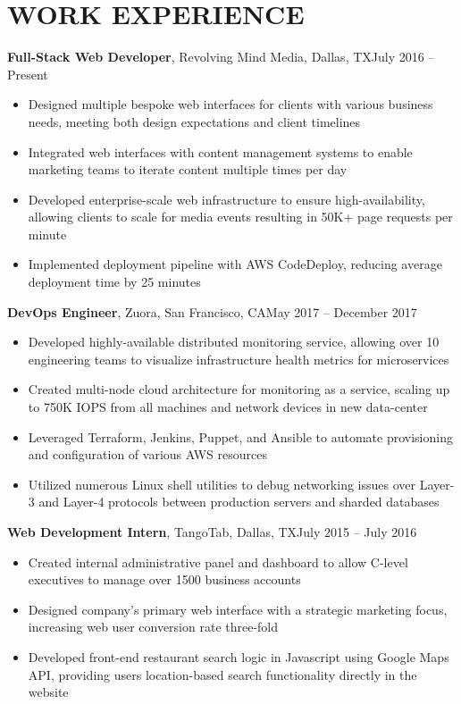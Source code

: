 \documentclass{resume}
\begin{document}
\maketitle

\section{WORK EXPERIENCE}
\textbf{Full-Stack Web Developer}, Revolving Mind Media, Dallas, TX\hfill{July 2016 -- Present}
\begin{itemize}\itemsep0.3em
\item Designed multiple bespoke web interfaces for clients with various business needs, meeting both design expectations and client timelines
\item Integrated web interfaces with content management systems to enable marketing teams to iterate content multiple times per day
\item Developed enterprise-scale web infrastructure to ensure high-availability, allowing clients to scale for media events resulting in 50K+ page requests per minute
\item Implemented deployment pipeline with AWS CodeDeploy, reducing average deployment time by 25 minutes
\end{itemize}\vspace{5pt}

\textbf{DevOps Engineer}, Zuora, San Francisco, CA\hfill{May 2017 -- December 2017}
\begin{itemize}\itemsep0.3em
\item Developed highly-available distributed monitoring service, allowing over 10 engineering teams to visualize infrastructure health metrics for microservices
\item Created multi-node cloud architecture for monitoring as a service, scaling up to 750K IOPS from all machines and network devices in new data-center
\item Leveraged Terraform, Jenkins, Puppet, and Ansible to automate provisioning and configuration of various AWS resources
\item Utilized numerous Linux shell utilities to debug networking issues over Layer-3 and Layer-4 protocols between production servers and sharded databases
\end{itemize}\vspace{5pt}

\textbf{Web Development Intern}, TangoTab, Dallas, TX\hfill{July 2015 -- July 2016}
\begin{itemize}\itemsep0.3em
\item Created internal administrative panel and dashboard to allow C-level executives to manage over 1500 business accounts
\item Designed company's primary web interface with a strategic marketing focus, increasing web user conversion rate three-fold
\item Developed front-end restaurant search logic in Javascript using Google Maps API, providing users location-based search functionality directly in the website
\end{itemize}\vspace{5pt}
\end{document}
